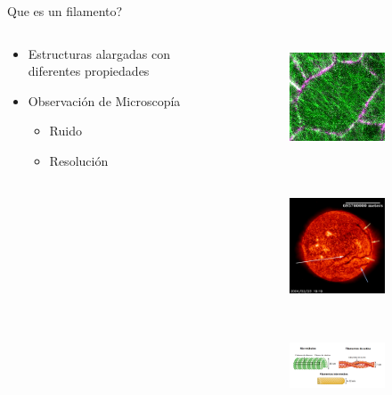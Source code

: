 \documentclass[]{beamer}
\newenvironment{figure*}%
{\begin{figure}}
{\end{figure}}
\begin{document}
\begin{frame}{Que es un filamento?}
    \begin{columns}
    \begin{column}{0.32\textwidth}
        \begin{itemize}
            \item Estructuras alargadas con diferentes propiedades
            \item Observaci\'on de Microscop\'ia
            \begin{itemize}
            \small
                \item Ruido
                \item Resoluci\'on
            \end{itemize}
        \end{itemize}
    \end{column}
    \begin{column}{0.68\textwidth}
        \begin{figure}[h]
          \centering
            \begin{subfigure}[t]{0.48\textwidth}
            \includegraphics[height=1.2in]{Pictures/small_MT.jpg}
            \end{subfigure}
            ~ 
            \begin{subfigure}[t]{0.48\textwidth}
            \includegraphics[height=1.2in]{Pictures/sun_filament.jpg}
            \end{subfigure}
            \vspace{0.5cm}
             \begin{subfigure}[t]{\textwidth}
             \includegraphics[height=1.2in]{Pictures/citoesqueletoo-min.png}
            \end{subfigure}
    
        \end{figure}
    \end{column}
\end{columns}
\end{frame}
\end{document}
